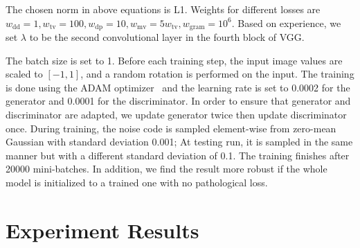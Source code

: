 \documentclass[letterpaper]{article} %
\begin{document}
	
	
	
	The chosen norm in above equations is L1.  Weights for different losses are $ w_\mathrm{dd} = 1, w_\mathrm{tv} = 100, w_\mathrm{dp} = 10, w_\mathrm{mv} = 5 w_\mathrm{tv}, w_\mathrm{gram} = 10^6 $. Based on experience, we set $ \lambda $ to be the second convolutional layer in the fourth block of VGG. 
	
	The batch size is set to 1. Before each training step, the input image values are scaled to $[-1, 1]$, and a random rotation is performed on the input. 
	The training is done using the ADAM optimizer~\cite{kingma2014adam} and the learning rate is set to 0.0002 for the generator and 0.0001 for the discriminator. In order to ensure that generator and discriminator are adapted, we update generator twice then update discriminator once. During training, the noise code is sampled element-wise from zero-mean Gaussian with standard deviation 0.001; At testing run, it is sampled in the same manner but with a different standard deviation of 0.1.
	The training finishes after 20000 mini-batches. In addition, we find the result more robust if the whole model is initialized to a trained one with no pathological loss.
	
	
		
	
	\section{Experiment Results}
    	
\end{document}

